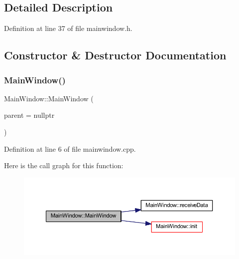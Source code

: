 \subsection{Detailed Description}


Definition at line 37 of file mainwindow.\+h.



\subsection{Constructor \& Destructor Documentation}
\mbox{\label{classMainWindow_a996c5a2b6f77944776856f08ec30858d}} 
\subsubsection{\texorpdfstring{MainWindow()}{MainWindow()}}
{\footnotesize\ttfamily Main\+Window\+::\+Main\+Window (\begin{DoxyParamCaption}\item[{Q\+Widget $\ast$}]{parent = {\ttfamily nullptr} }\end{DoxyParamCaption})\hspace{0.3cm}{\ttfamily [explicit]}}



Definition at line 6 of file mainwindow.\+cpp.

Here is the call graph for this function\+:
\nopagebreak
\begin{figure}[H]
\begin{center}
\leavevmode
\includegraphics[width=350pt]{classMainWindow_a996c5a2b6f77944776856f08ec30858d_cgraph}
\end{center}
\end{figure}
\mbox{\label{classMainWindow_ae98d00a93bc118200eeef9f9bba1dba7}} 
